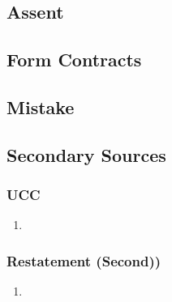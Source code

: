 \subsection{Assent}


\subsection{Form Contracts}


\subsection{Mistake}


\subsection{Secondary Sources}

\subsubsection{UCC}

\begin{enumerate}
    \item %
\end{enumerate}

\subsubsection{Restatement (Second))}

\begin{enumerate}
    \item %
\end{enumerate}
